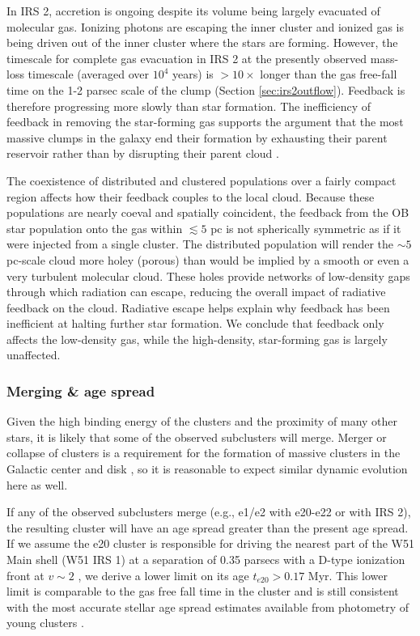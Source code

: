 In IRS 2, accretion is ongoing despite its volume being largely evacuated of
molecular gas.
Ionizing photons are escaping the inner cluster and ionized gas is being driven
out of the inner cluster where the stars are forming.  However, the timescale
for complete gas evacuation in IRS 2 at the presently observed mass-loss timescale
(averaged over $10^4$ years) is $>10\times$ longer than the gas free-fall time
on the 1-2 parsec scale of the clump 
(Section \ref{sec:irs2outflow}).
Feedback is therefore progressing more slowly
than star formation.
The inefficiency of feedback in removing the star-forming
gas supports the argument that the most massive clumps in
the galaxy  end their formation by exhausting their parent reservoir rather
than by disrupting their parent cloud \citep{Kruijssen2012a,Matzner2015a}.

The coexistence of distributed and clustered populations over a fairly compact
region affects how their feedback couples to the local cloud.  Because these
populations are nearly coeval and spatially coincident, the feedback from the
OB star population onto the gas within $\lesssim5$ pc is not spherically symmetric as
if it were injected from a single cluster.  The distributed population will
render the $\sim5$ pc-scale cloud more holey (porous) than would be
implied by a smooth or even a very turbulent molecular cloud.  These holes
provide networks of low-density gaps through which radiation can escape,
reducing the overall impact of radiative feedback on the cloud.  Radiative
escape helps explain why feedback has been inefficient at halting further star
formation.  We conclude that feedback only affects the low-density gas, while
the high-density, star-forming gas is largely unaffected.

\subsubsection{Merging \& age spread}
\label{sec:merging}
Given the high binding energy of the clusters and the proximity of many other
stars, it is likely that some of the observed subclusters will merge.  Merger
or collapse of clusters is a requirement for the formation of massive
clusters in the Galactic center and disk \citep{Walker2016a}, so it is reasonable to
expect similar dynamic evolution here as well.

If any of the observed subclusters merge (e.g., e1/e2 with e20-e22 or with
IRS 2), the
resulting cluster will have an age spread greater than the present
age spread.  If we assume the e20 cluster is responsible for driving the
nearest part of the W51 Main shell (W51 IRS 1) at a separation of 0.35 parsecs with a
D-type ionization front at $v\sim2$ \kms, we derive a lower limit on its age
$t_{e20} > 0.17$ Myr.  This lower limit is comparable to the gas free fall time
in the cluster and is still consistent with the most accurate stellar age
spread estimates available from photometry of young clusters
\citep[e.g.,][]{Kudryavtseva2012a}.

